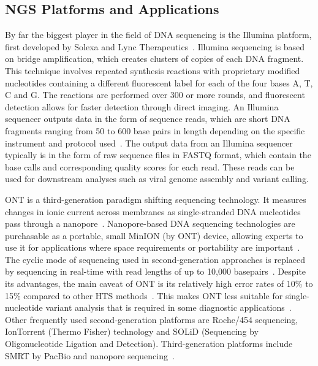 \subsection{NGS Platforms and Applications}
By far the biggest player in the field of \ac{DNA} sequencing is the Illumina platform, first developed by Solexa and Lync Therapeutics~\cite{illumina2015introduction}. Illumina sequencing is based on bridge amplification, which creates clusters of copies of each \ac{DNA} fragment. This technique involves repeated synthesis reactions with proprietary modified nucleotides containing a different fluorescent label for each of the four bases A, T, C and G. The reactions are performed over 300 or more rounds, and fluorescent detection allows for faster detection through direct imaging. An Illumina sequencer outputs data in the form of sequence reads, which are short \ac{DNA} fragments ranging from 50 to 600 base pairs in length depending on the specific instrument and protocol used~\cite{illumina2015introduction, slatko2018overview, mardis2008next}. The output data from an Illumina sequencer typically is in the form of raw sequence files in FASTQ format, which contain the base calls and corresponding quality scores for each read. These reads can be used for downstream analyses such as viral genome assembly and variant calling.

\ac{ONT} is a third-generation paradigm shifting sequencing technology. It measures changes in ionic current across membranes as single-stranded \ac{DNA} nucleotides pass through a nanopore~\cite{jain2016oxford}. Nanopore-based \ac{DNA} sequencing technologies are purchasable as a portable, small MinION (by \ac{ONT}) device, allowing experts to use it for applications where space requirements or portability are important~\cite{greninger2015rapid, jain2016oxford}. The cyclic mode of sequencing used in second-generation approaches is replaced by sequencing in real-time with read lengths of up to 10,000 basepairs~\cite{jain2016oxford}. Despite its advantages, the main caveat of \ac{ONT} is its relatively high error rates of 10\% to 15\% compared to other \ac{HTS} methods~\cite{fu2019comparative, laver2015assessing}. This makes \ac{ONT} less suitable for single-nucleotide variant analysis that is required in some diagnostic applications~\cite{bowden2019sequencing, stefan2022comparison}. \\
Other frequently used second-generation platforms are Roche/454 sequencing, IonTorrent (Thermo Fisher) technology and SOLiD (Sequencing by Oligonucleotide Ligation and Detection). Third-generation platforms include \ac{SMRT} by PacBio and nanopore sequencing~\cite{rhoads2015pacbio}. 

